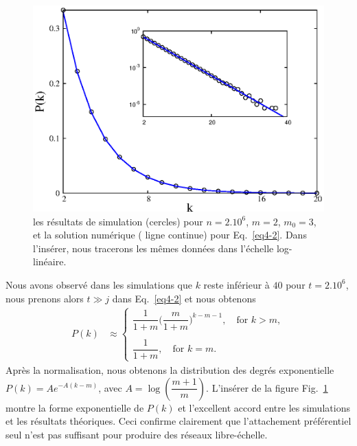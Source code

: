 \begin{figure}[h]
	\centering
	\includegraphics{./figures/fig1}
	\caption{les résultats de simulation (cercles)  pour $n=2.10^6$, $m=2$, $m_0=3$, et la solution numérique (	ligne continue) pour Eq.~\eqref{eq4-2}. Dans l'insérer, nous tracerons les mêmes données dans l'échelle log-linéaire.}
	\label{fig1-2}
 \end{figure} 
Nous avons observé dans les simulations que $k$ reste inférieur à $40$ pour $t=2.10^6$, nous prenons alors $t\gg j $ dans Eq.~\ref{eq4-2} et nous obtenons
\begin{align}
P(k)&\approx 
\begin{cases}
\dfrac{1}{1+m}\Big(\dfrac{m}{1+m}\Big)^{k-m-1}, \quad \textrm{for }  k>m,\\
\\
\dfrac{1}{1+m}, \quad\textrm{for }  k=m.
\end{cases}
\label{eq5-2}
\end{align}
Après la normalisation, nous obtenons la distribution des degrés exponentielle $P(k)=Ae^{-A(k-m)}$, avec $A=\log(\dfrac{m+1}{m})$.
L'insérer de la figure Fig.~\ref{fig1-2} montre la forme exponentielle de $ P(k)$ et l'excellent accord entre les simulations et les résultats théoriques.
Ceci confirme clairement que l'attachement préférentiel seul n'est pas suffisant pour produire des réseaux libre-échelle.

